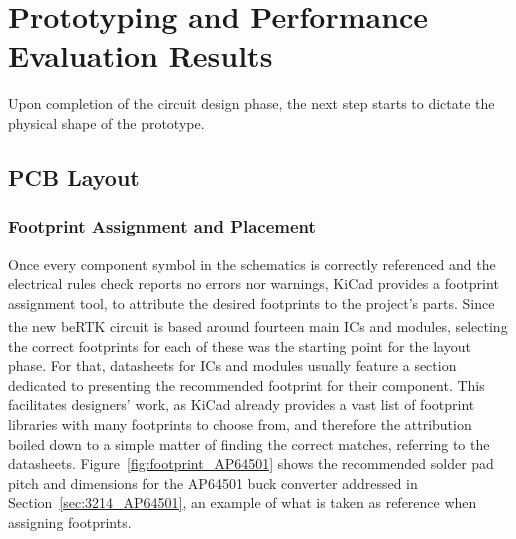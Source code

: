 

\chapter{Prototyping and Performance Evaluation Results}\label{cha:chapter5_PrototypingPerf}

Upon completion of the circuit design phase, the next step starts to dictate the physical shape of the prototype.

\section{PCB Layout}\label{sec:51_PCBlayout} %

\subsection{Footprint Assignment and Placement}\label{sec:511_Placement}

Once every component symbol in the schematics is correctly referenced and the electrical rules check reports no errors nor warnings, KiCad provides a footprint assignment tool, to attribute the desired footprints to the project's parts. Since the new beRTK\textsuperscript{\textregistered} circuit is based around fourteen main ICs and modules, selecting the correct footprints for each of these was the starting point for the layout phase. For that, datasheets for ICs and modules usually feature a section dedicated to presenting the recommended footprint for their component. This facilitates designers' work, as KiCad already provides a vast list of footprint libraries with many footprints to choose from, and therefore the attribution boiled down to a simple matter of finding the correct matches, referring to the datasheets. Figure~\ref{fig:footprint_AP64501} shows the recommended solder pad pitch and dimensions for the AP64501 buck converter addressed in Section~\ref{sec:3214_AP64501}, an example of what is taken as reference when assigning footprints.

